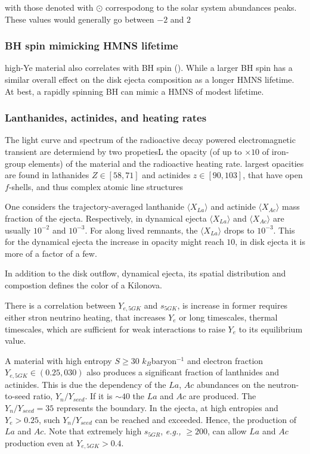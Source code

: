 \documentclass[11pt,a4paper,headinclude=true,DIV=14,BCOR=8mm,chapterprefix,listof=totoc,twoside,openright,abstracton]{scrbook}
\begin{document}
with those denoted with $\odot$ correspodong to the solar system abundances peaks. 
These values would generally go between $-2$ and $2$ 


\subsubsection{BH spin mimicking HMNS lifetime}

high-Ye material also correlates with BH spin (\cite{Fernandez et al., 2015a}).
While a larger BH spin has a similar overall effect on the disk ejecta composition as a longer HMNS lifetime.
At best, a rapidly spinning BH can mimic a HMNS of modest lifetime.


\subsubsection{Lanthanides, actinides, and heating rates}

The light curve and spectrum of the radioactive decay powered electromagnetic transient are determiend by two propetiesL the opacity (of up to $\times10$ of iron-group elements) of the material and the radioactive heating rate. largest opacities are found in lathanides $Z\in[58,71]$ and actinides $z\in[90,103]$, that have open $f$-shells, and thus complex atomic line structures \cite{(Kasen et al., 2013; Tanaka and Hotokezaka, 2013; Fontes et al., 2015)}

One considers the trajectory-averaged lanthanide $\langle X_{La} \rangle$ and actinide $\langle X_{Ac} \rangle$ mass fraction of the ejecta. Respectively, in dynamical ejecta $\langle X_{La} \rangle$ and $\langle X_{Ac} \rangle$ are usually $10^{-2}$ and $10^{-3}$. For along lived remnants, the $\langle X_{La} \rangle$ drops to $10^{-3}$. This for the dynamical ejecta the increase in opacity might reach $10$, in disk ejecta it is more of a factor of a few. 

In addition to the disk outflow, dynamical ejecta, its spatial distribution and compostion defines the color of a Kilonova. 

There is a correlation between $Y_{e, 5GK}$ and $s_{5GK}$, is increase in former requires either stron neutrino heating, that increases $Y_e$ or long timescales, thermal timescales, which are sufficient for weak interactions to raise $Y_e$ to its equilibrium value.

A material with high entropy $S\geq30$ $k_B$baryon$^{-1}$ and electron fraction $Y_{e,5GK}\in(0.25,030)$ also produces a significant fraction of lanthnides and actinides. This is due the dependency of the $La$, $Ac$ abundances on the neutron-to-seed ratio, $Y_n/Y_{seed}$. If it is $\sim40$ the $La$ and $Ac$ are produced. The $Y_n/Y_{seed}=35$ represents the boundary. In the ejecta, at high entropies and $Y_e>0.25$, such $Y_n/Y_{seed}$ can be reached and exceeded. Hence, the production of $La$ and $Ac$. Note that extremely high $s_{5GR}$, \textit{e.g.,} $\geq 200$, can allow $La$ and $Ac$ production even at $Y_{e,5GK}>0.4$. 
\end{document}
